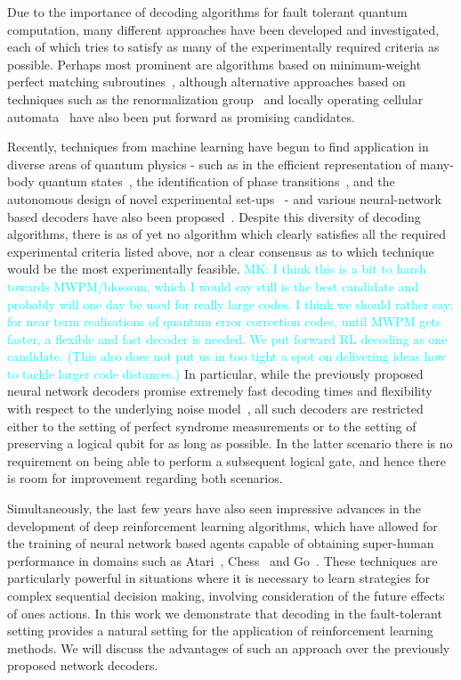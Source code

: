 \documentclass[twocolumn,preprintnumbers,amsmath,amssymb,notitlepage,nofootinbib,longbibliography,superscriptaddress,aps,pra,10pt]{revtex4-1}
\newcommand{\mk}[1]{\textcolor{Cyan}{MK: #1}}
\begin{document}
	Due to the importance of decoding algorithms for fault tolerant quantum computation, many different approaches have been developed
	and investigated, each of which tries to satisfy as many of the experimentally required criteria as possible.
	Perhaps most prominent are algorithms based on minimum-weight perfect matching subroutines~\cite{Fowler13},
	although alternative approaches based on techniques such as the renormalization group~\cite{Duclos2010} and
	locally operating cellular automata~\cite{Herold15, Kubica2018} have also been put forward as promising candidates.

	Recently, techniques from machine learning have begun to find application in diverse areas of quantum physics - such as in the efficient
	representation of many-body quantum states~\cite{Carleo16,todo}, the identification of phase transitions~\cite{Melko, Liu, todo}, and
	the autonomous design of novel experimental set-ups~\cite{Bruegel, Coles, todo} - and various neural-network based decoders have
	also been proposed~\cite{Torlai10, Varsamopoulos17, Krastanov17, Breuckmann18, Baireuther18a, Baireuther18b, Ni18}.
	Despite this diversity of decoding algorithms, there is as of yet no algorithm which clearly satisfies all
	the required experimental criteria listed above, nor a clear consensus as to which technique would be the most experimentally feasible.
	\mk{
		I think this is a bit to harsh towards MWPM/blossom, which I would say still is the best candidate and probably will one day be used for really large codes.
		I think we should rather say: for near term realisations of quantum error correction codes, until MWPM gets faster, a flexible and fast decoder is needed.
		We put forward RL decoding as one candidate.
		(This also does not put us in too tight a spot on delivering ideas how to tackle larger code distances.)
	}
	In particular, while the previously proposed neural network decoders promise extremely fast decoding times and
	flexibility with respect to the underlying noise model~\cite{Ronagh16}, all such decoders
	are restricted either to the setting of perfect syndrome measurements or to the setting of preserving a logical qubit for as long as possible.
	In the latter scenario there is no requirement on being able to perform a subsequent logical gate, and hence there is room for
	improvement regarding both scenarios.

	Simultaneously, the last few years have also seen impressive advances in the development of deep reinforcement learning algorithms,
	which have allowed for the training of neural network based agents capable of obtaining super-human performance in domains such
	as Atari~\cite{Mnih15}, Chess~\cite{Silver17a} and Go~\cite{Silver17b}.
	These techniques are particularly powerful in situations where it is necessary to learn strategies for complex sequential decision
	making, involving consideration of the future effects of ones actions. In this work we demonstrate that decoding in the fault-tolerant
	setting provides a natural setting for the application of reinforcement learning methods. We will discuss the advantages of such
	an approach over the previously proposed network decoders.
\end{document}
